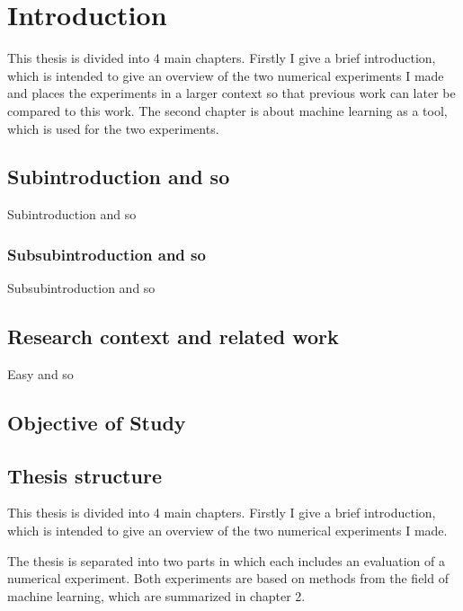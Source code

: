 \chapter{Introduction}

This thesis is divided into 4 main chapters. Firstly I give a brief introduction, which is intended to give an overview of the two numerical experiments I made and places the experiments in a larger context so that previous work can later be compared to this work.
The second chapter is about machine learning as a tool, which is used for the two experiments. 
\section{Subintroduction and so}
Subintroduction and so
\subsection{Subsubintroduction and so}
Subsubintroduction and so

\section{Research context and related work}
Easy and so

\section{Objective of Study}


\section{Thesis structure}
This thesis is divided into 4 main chapters. Firstly I give a brief introduction, which is intended to give an overview of the two numerical experiments I made.

The thesis is separated into two parts in which each includes an evaluation of a numerical experiment. Both experiments are based on methods from the field of machine learning, which are summarized in chapter 2.
